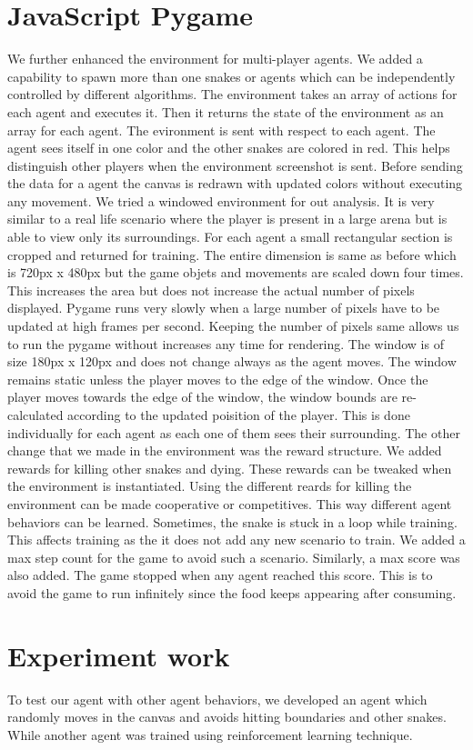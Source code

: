\documentclass{article}
\begin{document}
\section{JavaScript Pygame}
We further enhanced the environment for multi-player agents. We added a capability to spawn more than one snakes or agents which can be independently controlled by different algorithms. The environment takes an array of actions for each agent and executes it. Then it returns the state of the environment as an array for each agent. The evironment is sent with respect to each agent. The agent sees itself in one color and the other snakes are colored in red. This helps distinguish other players when the environment screenshot is sent. Before sending the data for a agent the canvas is redrawn with updated colors without executing any movement.
\break
\break
We tried a windowed environment for out analysis. It is very similar to a real life scenario where the player is present in a large arena but is able to view only its surroundings. For each agent a small rectangular section is cropped and returned for training. The entire dimension is same as before which is 720px x 480px but the game objets and movements are scaled down four times. This increases the area but does not increase the actual number of pixels displayed. Pygame runs very slowly when a large number of pixels have to be updated at high frames per second. Keeping the number of pixels same allows us to run the pygame without increases any time for rendering. The window is of size 180px x 120px and does not change always as the agent moves. The window remains static unless the player moves to the edge of the window. Once the player moves towards the edge of the window, the window bounds are re-calculated according to the updated poisition of the player. This is done individually for each agent as each one of them sees their surrounding.
\break
\break
The other change that we made in the environment was the reward structure. We added rewards for killing other snakes and dying. These rewards can be tweaked when the environment is instantiated. Using the different reards for killing the environment can be made cooperative or competitives. This way different agent behaviors can be learned.
\break
\break
Sometimes, the snake is stuck in a loop while training. This affects training as the it does not add any new scenario to train. We added a max step count for the game to avoid such a scenario. Similarly, a max score was also added. The game stopped when any agent reached this score. This is to avoid the game to run infinitely since the food keeps appearing after consuming.

\section{Experiment work}
To test our agent with other agent behaviors, we developed an agent which randomly moves in the canvas and avoids hitting boundaries and other snakes. While another agent was trained using reinforcement learning technique.
\end{document}
